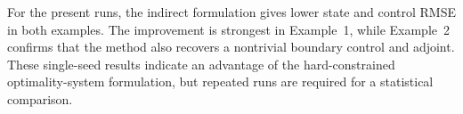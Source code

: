 For the present runs, the indirect formulation gives lower state and control RMSE in both examples. The improvement is strongest in Example~1, while Example~2 confirms that the method also recovers a nontrivial boundary control and adjoint. These single-seed results indicate an advantage of the hard-constrained optimality-system formulation, but repeated runs are required for a statistical comparison.

